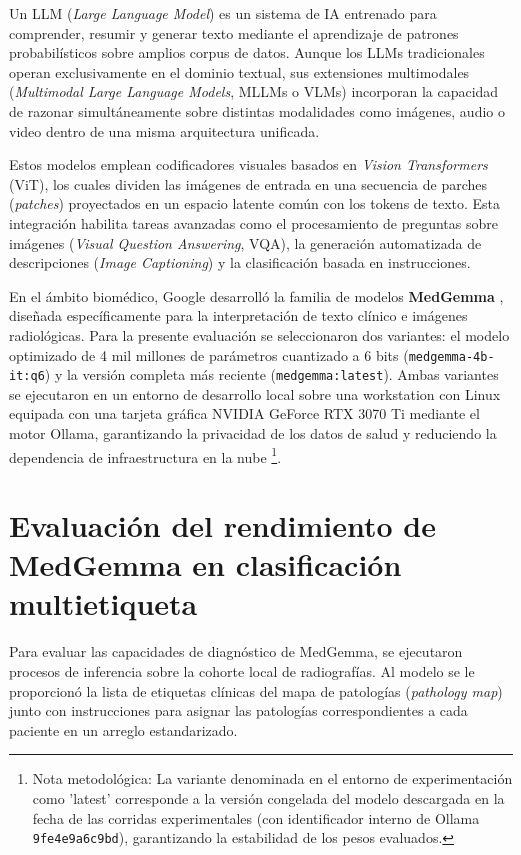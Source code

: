 \documentclass[../tesis.tex]{subfiles}
\begin{document}
Un LLM (\textit{Large Language Model}) es un sistema de IA entrenado para comprender, resumir y generar texto mediante el aprendizaje de patrones probabilísticos sobre amplios corpus de datos. Aunque los LLMs tradicionales operan exclusivamente en el dominio textual, sus extensiones multimodales (\textit{Multimodal Large Language Models}, MLLMs o VLMs) incorporan la capacidad de razonar simultáneamente sobre distintas modalidades como imágenes, audio o video dentro de una misma arquitectura unificada.

Estos modelos emplean codificadores visuales basados en \textit{Vision Transformers} (ViT), los cuales dividen las imágenes de entrada en una secuencia de parches (\textit{patches}) proyectados en un espacio latente común con los tokens de texto. Esta integración habilita tareas avanzadas como el procesamiento de preguntas sobre imágenes (\textit{Visual Question Answering}, VQA), la generación automatizada de descripciones (\textit{Image Captioning}) y la clasificación basada en instrucciones.

En el ámbito biomédico, Google desarrolló la familia de modelos \textbf{MedGemma} \citep{sellergren2026medgemmatechnicalreport}, diseñada específicamente para la interpretación de texto clínico e imágenes radiológicas. Para la presente evaluación se seleccionaron dos variantes: el modelo optimizado de 4 mil millones de parámetros cuantizado a 6 bits (\texttt{medgemma-4b-it:q6}) y la versión completa más reciente (\texttt{medgemma:latest}). Ambas variantes se ejecutaron en un entorno de desarrollo local sobre una workstation con Linux equipada con una tarjeta gráfica NVIDIA GeForce RTX 3070 Ti mediante el motor Ollama, garantizando la privacidad de los datos de salud y reduciendo la dependencia de infraestructura en la nube \footnote{Nota metodológica: La variante denominada en el entorno de experimentación como 'latest' corresponde a la versión congelada del modelo descargada en la fecha de las corridas experimentales (con identificador interno de Ollama \texttt{9fe4e9a6c9bd}), garantizando la estabilidad de los pesos evaluados.}.

\section{Evaluación del rendimiento de MedGemma en clasificación multietiqueta}
\label{sec:eval_medgemma}

Para evaluar las capacidades de diagnóstico de MedGemma, se ejecutaron procesos de inferencia sobre la cohorte local de radiografías. Al modelo se le proporcionó la lista de etiquetas clínicas del mapa de patologías (\textit{pathology map}) junto con instrucciones para asignar las patologías correspondientes a cada paciente en un arreglo estandarizado.
\end{document}
